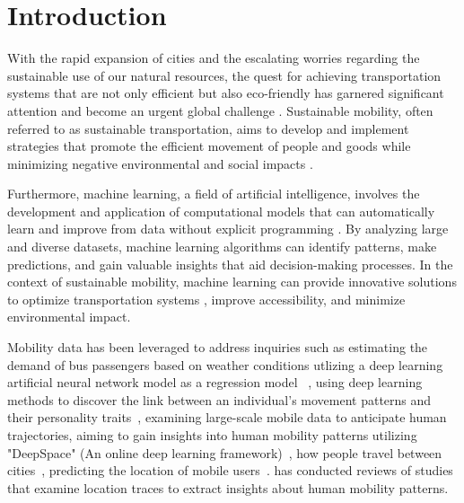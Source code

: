 %
\chapter{Introduction}
\label{sec:intro}
With the rapid expansion of cities and the escalating worries regarding the sustainable use of our natural resources, the quest for achieving transportation systems that are not only efficient but also eco-friendly has garnered significant attention and become an urgent global challenge \cite{PRILLWITZ20111590}. 
Sustainable mobility, often referred to as sustainable transportation, aims to develop and implement strategies that promote the efficient movement of people and goods while minimizing negative environmental and social impacts \cite{su8010029, akerman2000european}. 

Furthermore, machine learning, a field of artificial intelligence, involves the development and application of computational models that can automatically learn and improve from data without explicit programming \cite{zhou2021machine}. 
By analyzing large and diverse datasets, machine learning algorithms can identify patterns, make predictions, and gain valuable insights that aid decision-making processes. In the context of sustainable mobility, machine learning can provide innovative solutions to optimize transportation systems \cite{wagner2022:urban-sm}, improve accessibility, and minimize environmental impact.

Mobility data has been leveraged to address inquiries such as estimating the demand of bus passengers based
on weather conditions utlizing a deep learning artificial neural network model as a regression model
~\cite{fontes2020deep}, using deep learning methods to discover the link between an individual's movement 
patterns and their personality traits~\cite{kim2018method}, examining large-scale mobile data to anticipate 
human trajectories, aiming to gain insights into human mobility patterns utilizing "DeepSpace" 
(An online deep learning framework)~\cite{ouyang2016deepspace}, how people travel between 
cities~\cite{reades2007cellular}, predicting the location of mobile users~\cite{anagnostopoulos2009predicting}.
\cite{toch2019analyzing} has conducted reviews of studies that examine location traces to extract insights about human mobility patterns.



